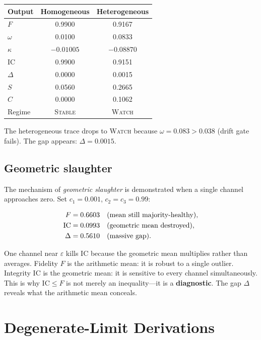 \documentclass[
  aps,
  prd,
  twocolumn,
  superscriptaddress,
  nofootinbib,
  floatfix
]{revtex4-2}
\newcommand{\eps}{\varepsilon}
\newcommand{\regime}[1]{\textrm{\upshape\scshape#1}}
\newcommand{\IC}{\mathrm{IC}}
\begin{document}
\begin{center}
\begin{tabular}{lcc}
\toprule
Output & Homogeneous & Heterogeneous \\
\midrule
$F$ & 0.9900 & 0.9167 \\
$\omega$ & 0.0100 & 0.0833 \\
$\kappa$ & $-0.01005$ & $-0.08870$ \\
$\IC$ & 0.9900 & 0.9151 \\
$\Delta$ & 0.0000 & 0.0015 \\
$S$ & 0.0560 & 0.2665 \\
$C$ & 0.0000 & 0.1062 \\
Regime & \regime{Stable} & \regime{Watch} \\
\bottomrule
\end{tabular}
\end{center}

The heterogeneous trace drops to \regime{Watch} because
$\omega = 0.083 > 0.038$ (drift gate fails).  The gap appears:
$\Delta = 0.0015$.

\subsection{Geometric slaughter}\label{app:slaughter}

The mechanism of \emph{geometric slaughter} is demonstrated when
a single channel approaches zero.  Set $c_1 = 0.001$,
$c_2 = c_3 = 0.99$:

\begin{align}
  F &= 0.6603 \quad \text{(mean still majority-healthy)}, \notag \\
  \IC &= 0.0993 \quad \text{(geometric mean destroyed)}, \notag \\
  \Delta &= 0.5610 \quad \text{(massive gap)}. \notag
\end{align}

One channel near $\eps$ kills $\IC$ because the geometric mean
multiplies rather than averages.  Fidelity $F$ is the arithmetic
mean: it is robust to a single outlier.  Integrity $\IC$ is the
geometric mean: it is sensitive to every channel simultaneously.
This is why $\IC \leq F$ is not merely an inequality---it is a
\textbf{diagnostic}.  The gap $\Delta$ reveals what the arithmetic
mean conceals.


\section{Degenerate-Limit Derivations}\label{app:degenerate}
\end{document}
